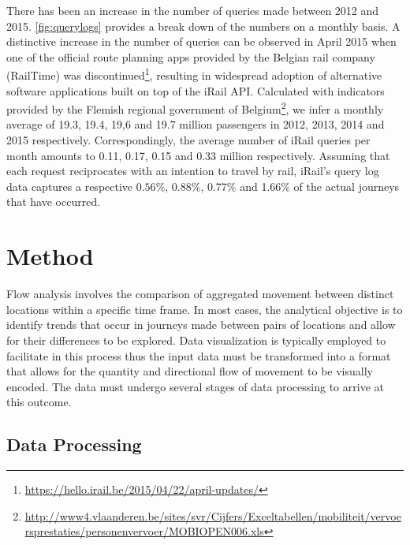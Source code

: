 \documentclass{sig-alternate}
\begin{document}
There has been an increase in the number of queries made between 2012 and 2015. 
\cref{fig:querylogs} provides a break down of the numbers on a monthly basis. 
A distinctive increase in the number of queries can be observed in April 2015 when one of the official route planning apps provided by the Belgian rail company (RailTime) was discontinued\footnote{\url{https://hello.irail.be/2015/04/22/april-updates/}}, resulting in widespread adoption of alternative software applications built on top of the iRail API.
Calculated with indicators provided by the Flemish regional government of Belgium\footnote{\url{http://www4.vlaanderen.be/sites/svr/Cijfers/Exceltabellen/mobiliteit/vervoersprestaties/personenvervoer/MOBIOPEN006.xls}}, we infer a monthly average of 19.3, 19.4, 19,6 and 19.7 million passengers in 2012, 2013, 2014 and 2015 respectively. 
Correspondingly, the average number of iRail queries per month amounts to 0.11, 0.17, 0.15 and 0.33 million respectively.
Assuming that each request reciprocates with an intention to travel by rail, iRail's query log data captures a respective $0.56\%$, 0.88\%, 0.77\% and 1.66\% of the actual journeys that have occurred.

\section{Method}
\label{sec:method}

Flow analysis involves the comparison of aggregated movement between distinct locations within a specific time frame. 
In most cases, the analytical objective is to identify trends that occur in journeys made between pairs of locations and allow for their differences to be explored. 
Data visualization is typically employed to facilitate in this process thus the input data must be transformed into a format that allows for the quantity and directional flow of movement to be visually encoded.
The data must undergo several stages of data processing to arrive at this outcome.

\subsection{Data Processing}
\end{document}
